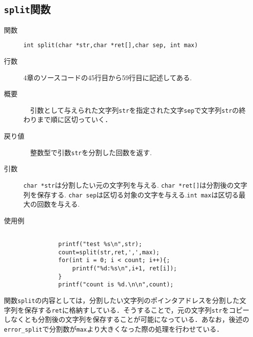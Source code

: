 \documentclass[a4j,11pt]{jarticle}
\begin{document}
\subsection{\texttt{split}関数}
 \begin{description}
    \item[関数] \verb|int split(char *str,char *ret[],char sep, int max)|
    \item[行数]  4章のソースコードの45行目から59行目に記述してある.
    \item[概要]　引数として与えられた文字列\verb|str|を指定された文字\verb|sep|で文字列\verb|str|の終わりまで順に区切っていく．
    \item[戻り値]　整数型で引数\verb|str|を分割した回数を返す.
    \item[引数]  \verb|char *str|は分割したい元の文字列を与える. \verb|char *ret[]|は分割後の文字列を保存する. \verb|char sep|は区切る対象の文字を与える.\verb|int max|は区切る最大の回数を与える. 
    \item[使用例]
      \begin{verbatim}

          printf("test %s\n",str);
          count=split(str,ret,',',max);
          for(int i = 0; i < count; i++){;
              printf("%d:%s\n",i+1, ret[i]);
          }
          printf("count is %d.\n\n",count);
      \end{verbatim}
\end{description}
関数\verb|split|の内容としては，分割したい文字列のポインタアドレスを分割した文字列を保存する\verb|ret|に格納すしている．そうすることで，元の文字列\verb|str|をコピーしなくとも分割後の文字列を保存することが可能になっている．あなお，後述の\verb|error_split|で分割数が\verb|max|より大きくなった際の処理を行わせている．

\end{document}
